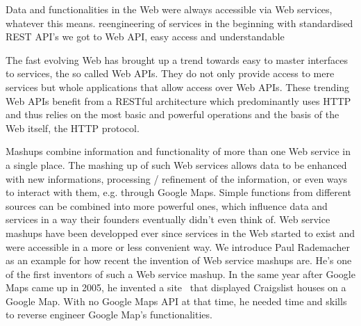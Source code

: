 Data and functionalities in the Web were always accessible via Web services, whatever this means.
reengineering of services in the beginning
with standardised REST API's we got to Web API, easy access and understandable


The fast evolving Web has brought up a trend towards easy to master interfaces to services, the so called Web APIs.
They do not only provide access to mere services but whole applications that allow access over Web APIs.
These trending Web APIs benefit from a RESTful architecture which predominantly uses HTTP and thus relies on the most basic and powerful operations and the basis of the Web itself, the HTTP protocol. 










Mashups combine information and functionality of more than one Web service in a single place.
The mashing up of such Web services allows data to be enhanced with new informations, processing / refinement of the information, or even ways to interact with them, e.g. through Google Maps.
Simple functions from different sources can be combined into more powerful ones, which influence data and services in a way their founders eventually didn't even think of.
Web service mashups have been developped ever since services in the Web started to exist and were accessible in a more or less convenient way.
We introduce Paul Rademacher as an example for how recent the invention of Web service mashups are.
He's one of the first inventors of such a Web service mashup.
In the same year after Google Maps came up in 2005, he invented a site~\cite{wwwRademacherOne,wwwRademacherTwo} that displayed Craigslist houses on a Google Map.
With no Google Maps API at that time, he needed time and skills to reverse engineer Google Map's functionalities.


